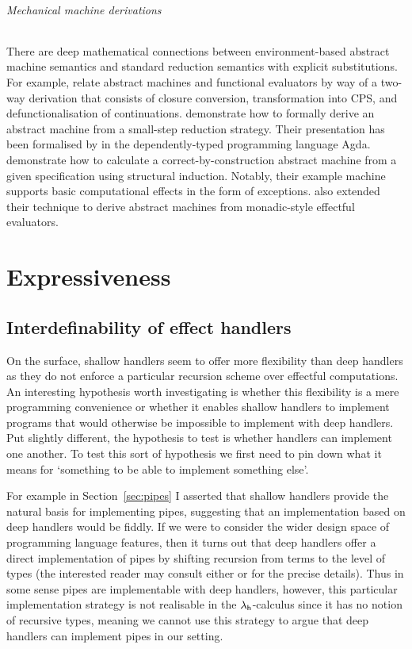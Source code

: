 \documentclass[12pt,phd,lfcs,twoside,openright,logo,leftchapter,normalheadings]{infthesis}
\theoremstyle{plain}
\theoremstyle{definition}
\begin{document}
\paragraph{Mechanical machine derivations}
%
There are deep mathematical connections between environment-based
abstract machine semantics and standard reduction semantics with
explicit substitutions.
%
For example, \citet{AgerBDM03,AgerDM04,AgerBDM03a} relate abstract
machines and functional evaluators by way of a two-way derivation that
consists of closure conversion, transformation into CPS, and
defunctionalisation of continuations.
%
\citet{BiernackaD07} demonstrate how to formally derive an abstract
machine from a small-step reduction strategy. Their presentation has
been formalised by \citet{Swierstra12} in the dependently-typed
programming language Agda.
%
\citet{HuttonW04} demonstrate how to calculate a
correct-by-construction abstract machine from a given specification
using structural induction. Notably, their example machine supports
basic computational effects in the form of exceptions.
%
\citet{AgerDM05} also extended their technique to derive abstract
machines from monadic-style effectful evaluators.


\part{Expressiveness}
\label{p:expressiveness}
\chapter{Interdefinability of effect handlers}
\label{ch:deep-vs-shallow}

On the surface, shallow handlers seem to offer more flexibility than
deep handlers as they do not enforce a particular recursion scheme
over effectful computations. An interesting hypothesis worth
investigating is whether this flexibility is a mere programming
convenience or whether it enables shallow handlers to implement
programs that would otherwise be impossible to implement with deep
handlers. Put slightly different, the hypothesis to test is whether
handlers can implement one another. To test this sort of hypothesis we
first need to pin down what it means for `something to be able to
implement something else'.

For example in Section~\ref{sec:pipes} I asserted that shallow
handlers provide the natural basis for implementing pipes, suggesting
that an implementation based on deep handlers would be fiddly. If we
were to consider the wider design space of programming language
features, then it turns out that deep handlers offer a direct
implementation of pipes by shifting recursion from terms to the level
of types (the interested reader may consult either \citet{KammarLO13}
or \citet{HillerstromL18} for the precise details). Thus in some sense
pipes are implementable with deep handlers, however, this particular
implementation strategy is not realisable in the $\lambda_{\mathsf{h}}$-calculus
since it has no notion of recursive types, meaning we cannot use this
strategy to argue that deep handlers can implement pipes in our
setting.
%
\end{document}
